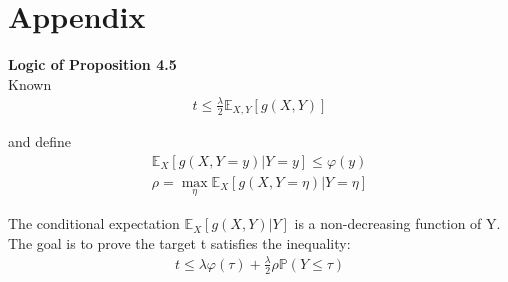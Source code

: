 \documentclass{article}
\theoremstyle{plain}
\begin{document}
\newpage
\section*{Appendix}

\textbf{Logic of \cite{boucheron2012} Proposition 4.5}\\

Known
\begin{align}
    t \leq  \frac{\lambda}{2} \mathbb{E}_{X, Y}[g(X, Y)]
\end{align}

and define
\begin{align}
    \mathbb{E}_X[g(X, Y = y)| Y = y] \leq \varphi (y)\\
    \rho = \max_{\eta} \mathbb{E}_X[g(X, Y = \eta)|Y = \eta]
\end{align}

The conditional expectation $\mathbb{E}_X[g(X, Y)| Y]$ is a non-decreasing function of Y.\\

The goal is to prove the target t satisfies the inequality:\\
\begin{align}
    t \leq \lambda \varphi(\tau) + \frac{\lambda}{2} \rho \mathbb{P}(Y \leq \tau)
\end{align}
\end{document}
